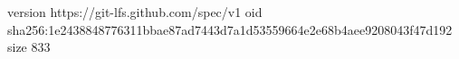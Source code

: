 version https://git-lfs.github.com/spec/v1
oid sha256:1e2438848776311bbae87ad7443d7a1d53559664e2e68b4aee9208043f47d192
size 833
